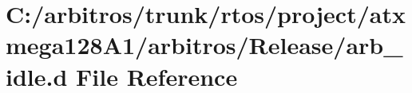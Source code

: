 \hypertarget{rtos_2project_2atxmega128_a1_2arbitros_2_release_2arb__idle_8d}{\section{C\-:/arbitros/trunk/rtos/project/atxmega128\-A1/arbitros/\-Release/arb\-\_\-idle.d File Reference}
\label{rtos_2project_2atxmega128_a1_2arbitros_2_release_2arb__idle_8d}
}
